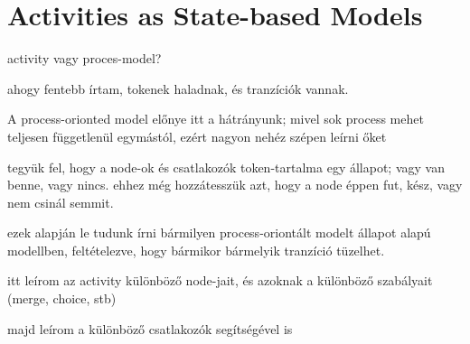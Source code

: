 \section{Activities as State-based Models}

activity vagy proces-model?

ahogy fentebb írtam, tokenek haladnak, és tranzíciók vannak.

A process-orionted model előnye itt a hátrányunk; mivel sok process mehet teljesen függetlenül egymástól, ezért nagyon nehéz szépen leírni őket

tegyük fel, hogy a node-ok és csatlakozók token-tartalma egy állapot; vagy van benne, vagy nincs. ehhez még hozzátesszük azt, hogy a node éppen fut, kész, vagy nem csinál semmit.

ezek alapján le tudunk írni bármilyen process-oriontált modelt állapot alapú modellben, feltételezve, hogy bármikor bármelyik tranzíció tüzelhet.

itt leírom az activity különböző node-jait, és azoknak a különböző szabályait (merge, choice, stb)

majd leírom a különböző csatlakozók segítségével is
